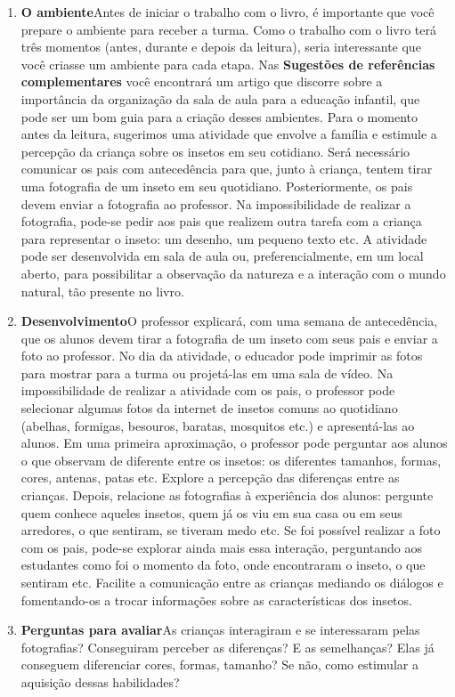 \documentclass[11pt]{extarticle}
\begin{document}
\begin{enumerate}
\item \textbf{O ambiente}\quad Antes de iniciar o trabalho com o livro, é importante que você prepare o ambiente para receber a turma. Como o trabalho com o livro terá 
três momentos (antes, durante e depois da leitura), seria interessante que você 
criasse um ambiente para cada etapa. Nas \textbf{Sugestões de referências complementares} 
você encontrará um artigo que discorre sobre a importância da organização da sala 
de aula para a educação infantil, que pode ser um bom guia para a criação desses 
ambientes. Para o momento antes da leitura, sugerimos uma atividade que envolve a família e estimule a percepção da criança sobre os insetos em seu cotidiano.
Será necessário comunicar os pais com antecedência para que, junto à criança, tentem tirar uma fotografia de um inseto em seu quotidiano. Posteriormente, os pais devem enviar a fotografia ao professor. Na impossibilidade de realizar a fotografia, pode-se pedir aos pais que realizem outra tarefa com a criança para representar o inseto: um desenho, um pequeno texto etc. A atividade pode ser desenvolvida em sala de aula ou, preferencialmente, em um local aberto, para possibilitar a observação da natureza e a interação com o mundo natural, tão presente no livro.

\item \textbf{Desenvolvimento}\quad O professor explicará, com uma semana de antecedência, que os alunos devem tirar a fotografia de um inseto com seus pais e enviar a foto ao professor. No dia da atividade, o educador pode imprimir as fotos para mostrar para a turma ou projetá-las em uma sala de vídeo. Na impossibilidade de realizar a atividade com os pais, o professor pode selecionar algumas fotos da internet de insetos comuns ao quotidiano (abelhas, formigas, besouros, baratas, mosquitos etc.) e apresentá-las ao alunos.
Em uma primeira aproximação, o professor pode perguntar aos alunos o que observam de diferente entre os insetos: os diferentes tamanhos, formas, cores, antenas, patas etc. Explore a percepção das diferenças entre as crianças.
Depois, relacione as fotografias à experiência dos alunos: pergunte quem conhece aqueles insetos, quem já os viu em sua casa ou em seus arredores, o que sentiram, se tiveram medo etc. Se foi possível realizar a foto com os pais, pode-se explorar ainda mais essa interação, perguntando aos estudantes como foi o momento da foto, onde encontraram o inseto, o que sentiram etc.
Facilite a comunicação entre as crianças mediando os diálogos e fomentando-os a trocar informações sobre as características dos insetos.

\item \textbf{Perguntas para avaliar}\quad As crianças interagiram e se interessaram pelas fotografias? Conseguiram perceber as diferenças? E as semelhanças? Elas já conseguem diferenciar cores, formas, tamanho? Se não, como estimular a aquisição dessas habilidades? 
\end{enumerate}
\end{document}
